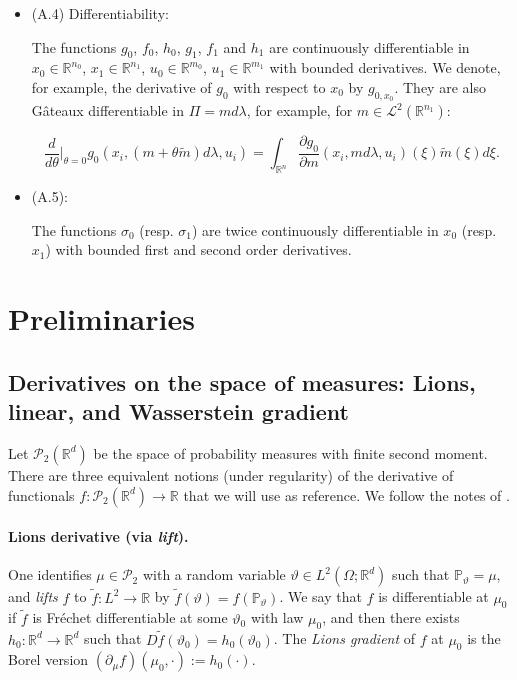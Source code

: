 \documentclass[12pt]{article}
\theoremstyle{definition}
\begin{document}
\begin{itemize}
\item (A.4) Differentiability:

The functions \( g_0 \), \( f_0 \), \( h_0 \), \( g_1 \), \( f_1 \) and \( h_1 \) are continuously differentiable in \( x_0 \in \mathbb{R}^{n_0} \), \( x_1 \in \mathbb{R}^{n_1} \), \( u_0 \in \mathbb{R}^{m_0} \), \( u_1 \in \mathbb{R}^{m_1} \) with bounded derivatives. We denote, for example, the derivative of \( g_0 \) with respect to \( x_0 \) by \( g_{0,x_0} \). They are also G\^{a}teaux differentiable in \( \Pi = m d\lambda \), for example, for \( m \in \mathcal{L}^2(\mathbb{R}^{n_1}) \):

\[
\frac{d}{d\theta} \bigg|_{\theta = 0} g_0(x_i, (m + \theta \tilde{m}) d\lambda, u_i) = \int_{\mathbb{R}^n} \frac{\partial g_0}{\partial m}(x_i, m d\lambda, u_i)(\xi) \tilde{m}(\xi) d\xi.
\]

\item (A.5):

The functions \( \sigma_0 \) (resp. \( \sigma_1 \)) are twice continuously differentiable in \( x_0 \) (resp. \( x_1 \)) with bounded first and second order derivatives.

\end{itemize}

\section{Preliminaries}

\subsection{Derivatives on the space of measures: Lions, linear, and Wasserstein gradient}

Let $\mathcal{P}_2(\mathbb{R}^d)$ be the space of probability measures with finite second moment. There are three equivalent notions (under regularity) of the derivative of functionals $f:\mathcal{P}_2(\mathbb{R}^d)\to\mathbb{R}$ that we will use as reference. We follow the notes of \cite{guo2022itoformula, korici2024lionsderivative}.

\paragraph{Lions derivative (via \emph{lift}).}
One identifies $\mu\in\mathcal{P}_2$ with a random variable $\vartheta\in L^2(\Omega;\mathbb{R}^d)$ such that $\mathbb{P}_\vartheta=\mu$, and \emph{lifts} $f$ to $\tilde f:L^2\to\mathbb{R}$ by $\tilde f(\vartheta)=f(\mathbb{P}_\vartheta)$. We say that $f$ is differentiable at $\mu_0$ if $\tilde f$ is Fr\'{e}chet differentiable at some $\vartheta_0$ with law $\mu_0$, and then there exists $h_0:\mathbb{R}^d\to\mathbb{R}^d$ such that $D\tilde f(\vartheta_0)=h_0(\vartheta_0)$. The \emph{Lions gradient} of $f$ at $\mu_0$ is the Borel version $(\partial_\mu f)(\mu_0,\cdot):=h_0(\cdot)$.
\end{document}
